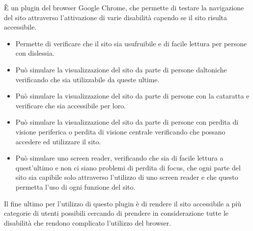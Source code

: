 È un plugin del browser Google Chrome, che permette di testare la navigazione del sito attraverso l'attivazione di varie disabilità capendo se il sito risulta accessibile.
\begin{itemize}
	\item Permette di verificare che il sito sia usufruibile e di facile 	lettura per persone con dislessia.
	\item Può simulare la visualizzazione del sito da parte di persone daltoniche verificando che sia utilizzabile da queste ultime.
	\item Può simulare la visualizzazione del sito da parte di persone con la cataratta e verificare che sia accessibile per loro.
	\item Può simulare la visualizzazione del sito da parte di persone con perdita di visione periferica o perdita di visione centrale verificando che possano accedere ed utilizzare il sito.
	\item Può simulare uno screen reader, verificando che sia di facile lettura a quest'ultimo e non ci siano problemi di perdita di focus, che ogni parte del sito sia capibile solo attraverso l'utilizzo di uno screen reader e che questo permetta l'uso di ogni funzione del sito.
\end{itemize}
Il fine ultimo per l'utilizzo di questo plugin è di rendere il sito accessibile a più categorie di utenti possibili cercando di prendere in considerazione tutte le disabilità che rendono complicato l'utilizzo del browser.\\